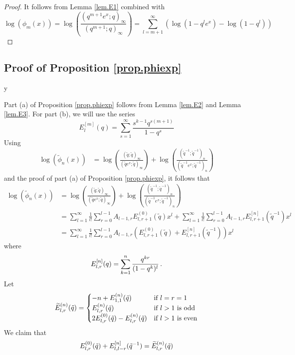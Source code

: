 \documentclass[12pt]{amsart}
\theoremstyle{definition}
\def\printname#1{
        \if\draft y
                \smash{\makebox[0pt]{\hspace{-0.5in}
                        \raisebox{8pt}{\tt\tiny #1}}}
        \fi
}
\def\lbl#1{\label{#1}\printname{#1}}
\def\ti{\widetilde}
\def\tq{\tilde{q}}
\begin{document}
\begin{proof}
It follows from Lemma \ref{lem.E1} combined with 
$$
\log (\phi_m(x))= \log\left(
\frac{(q^{m+1} e^{x};q)_\infty}{(q^{m+1};q)_\infty} \right)
= \sum_{l=m+1}^\infty \left( \log(1-q^l e^{x}) -\log(1-q^l) \right)
$$
\end{proof}

\subsection{Proof of Proposition \ref{prop.phiexp}}
\lbl{sub.prop.phiexp}

Part (a) of Proposition \ref{prop.phiexp} follows from Lemma \ref{lem.E2}
and Lemma \ref{lem.E3}. For part (b), we will use the series
$$
E_l^{[m]}(q) =\sum_{s=1}^\infty \frac{s^{k-1} q^{s(m+1)}}{1-q^s} 
$$
Using 
\begin{align*}
\log ( \ti \phi_n(x)) &= 
\log\left( \frac{(\tq;\tq)_\infty}{(\tq e^{x};\tq)_\infty}\right)+
\log\left(
\frac{(\tq^{-1};\tq^{-1})_n}{(\tq^{-1} e^{x};\tq^{-1})_n} \right)  
\end{align*}
and the proof of part (a) of Proposition \ref{prop.phiexp}, it follows that
\begin{align*}
\log ( \ti \phi_n(x)) &= 
\log\left( \frac{(\tq;\tq)_\infty}{(\tq e^{x};\tq)_\infty}\right)+
\log\left(
\frac{(\tq^{-1};\tq^{-1})_n}{(\tq^{-1} e^{x};\tq^{-1})_n} \right) \\
& = 
\sum_{l=1}^\infty \frac{1}{l!} \sum_{r=0}^{l-1} A_{l-1,r} E^{(0)}_{l,r+1}(\tq) x^l 
+
\sum_{l=1}^\infty \frac{1}{l!} \sum_{r=0}^{l-1} A_{l-1,r} E^{[n]}_{l,r+1}(\tq^{-1}) x^l 
\\
& = \sum_{l=1}^\infty \frac{1}{l!} \sum_{r=0}^{l-1} A_{l-1,r} 
\left(E^{(0)}_{l,r+1}(\tq) + E^{[n]}_{l,r+1}(\tq^{-1}) \right) x^l
\end{align*}
where
\begin{equation}
\lbl{eq.E[n]}
E_{l,r}^{[n]}(q)=\sum_{k=1}^n \frac{q^{k r}}{(1-q^k)^l} \,.
\end{equation}
Let
\begin{equation}
\lbl{eq.tiE}
\ti E^{(n)}_{l,r}(\tq) =  
\begin{cases}
-n + E^{(n)}_{1,1}(\tq) & \text{if $l=r=1$} \\
E^{(n)}_{l,r}(\tq)   & \text{if $l>1$ is odd} \\
2 E^{(0)}_{l,r}(\tq) - E^{(n)}_{l,r}(\tq) & \text{if $l>1$ is even} 
\end{cases}
\end{equation}
We claim that 
\begin{equation}
\lbl{eq.lemE1}
E^{(0)}_{l,r}(\tq) + E^{[n]}_{l,l-r}(\tq^{-1}) =\ti E^{(n)}_{l,r}(\tq)
\end{equation}
\end{document}

